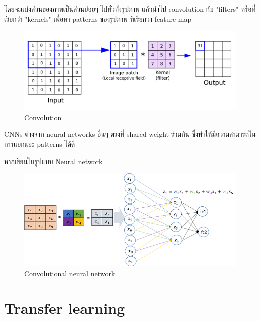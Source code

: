 โดยจะแบ่งส่วนของภาพเป็นส่วนย่อยๆ ไปทั่วทั้งรูปภาพ แล้วนำไป convolution กับ  "filters" หรือที่เรียกว่า "kernels" เพื่อหา patterns ของรูปภาพ ที่เรียกว่า feature map
\begin{figure}[h]
  \begin{center}
  \includegraphics[scale=0.05]{pic/cnn.png}
  \end{center}
  \caption[Convolution]{Convolution}
  \label{fig:Convolution }
  \end{figure}


CNNs ต่างจาก neural networks อื่นๆ ตรงที่  shared-weight ร่วมกัน ซึ่งทำให้มีความสามารถในการแยกแยะ patterns ได้ดี


หากเขียนในรูปแบบ Neural network
\begin{figure}[h]
  \begin{center}
  \includegraphics[scale=0.45]{pic/cnn_nn.png}
  \end{center}

  \caption[Convolutional neural network]{Convolutional neural network }
  \label{fig:Convolutional neural network }
  \end{figure}


\section{Transfer learning}


